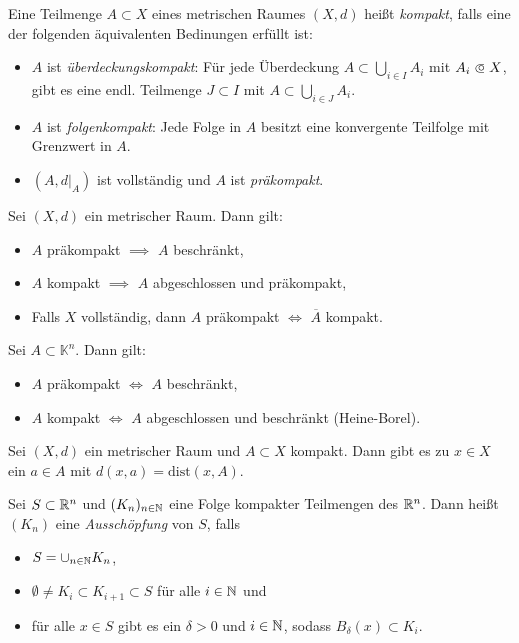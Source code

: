 \documentclass{cheat-sheet}
\newcommand{\K}{\mathbb{K}}
\newcommand{\dist}{\mathrm{dist}} %
\begin{document}
\begin{defn}
  Eine Teilmenge $A \subset X$ eines metrischen Raumes $(X, d)$ heißt \emph{kompakt}, falls eine der folgenden äquivalenten Bedinungen erfüllt ist:
  \begin{itemize}
    \item $A$ ist \emph{überdeckungskompakt}: Für jede Überdeckung $A \subset \bigcup_{i \in I} A_i$ mit $A_i \opn X$,  gibt es eine endl. Teilmenge $J \subset I$ mit $A \subset \bigcup_{i \in J} A_i$.
    \item $A$ ist \emph{folgenkompakt}: Jede Folge in $A$ besitzt eine konvergente Teilfolge mit Grenzwert in $A$.
    \item $(A, d|_A)$ ist vollständig und $A$ ist \emph{präkompakt}.
  \end{itemize}
\end{defn}

\begin{satz}
  Sei $(X, d)$ ein metrischer Raum. Dann gilt:
  \begin{itemize}
    \item $A$ präkompakt $\implies$ $A$ beschränkt,
    \item $A$ kompakt $\implies$ $A$ abgeschlossen und präkompakt,
    \item Falls $X$ vollständig, dann $A$ präkompakt $\iff$ $\overline{A}$ kompakt.
  \end{itemize}
\end{satz}

\begin{satz}
  Sei $A \subset \K^n$. Dann gilt:
  \begin{itemize}
    \item $A$ präkompakt $\iff$ $A$ beschränkt,
    \item $A$ kompakt $\iff$ $A$ abgeschlossen und beschränkt (Heine-Borel).
  \end{itemize}
\end{satz}

\begin{satz}
  Sei $(X, d)$ ein metrischer Raum und $A \subset X$ kompakt. Dann gibt es zu $x \in X$ ein $a \in A$ mit $d(x, a) = \dist(x, A)$.
\end{satz}

\begin{defn}
  Sei $S \subset \mathbb{R}^n$ und $(K_n)_{n \in \mathbb{N}}$ eine Folge kompakter Teilmengen des $\mathbb{R}^n$. Dann heißt $(K_n)$ eine \emph{Ausschöpfung} von $S$, falls
  \begin{itemize}
    \item $S = \cup_{n \in \mathbb{N}} K_n$,
    \item $\emptyset \not= K_i \subset K_{i+1} \subset S$ für alle $i \in \mathbb{N}$ und
    \item für alle $x \in S$ gibt es ein $\delta > 0$ und $i \in \mathbb{N}$, sodass $B_\delta(x) \subset K_i$.
  \end{itemize}
\end{defn}
\end{document}
